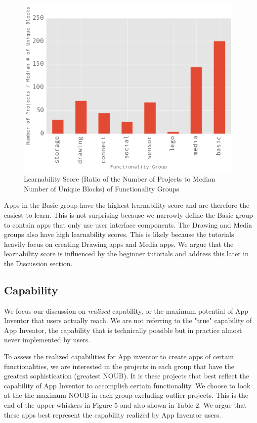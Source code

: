 \documentclass[conference]{IEEEtran}
\begin{document}
\begin{figure}[h!]
	\centering
	\includegraphics[width=1\linewidth]{learnability.png}
	\caption{Learnability Score (Ratio of the Number of Projects to Median Number of Unique Blocks) of Functionality Groups}
	\label{LearnabilityScore}
\end{figure}

Apps in the Basic group have the highest learnability score and are therefore the easiest to learn. This is not surprising because we narrowly define the Basic group to contain apps that only use user interface components. The Drawing and Media groups also have high learnability scores. This is likely because the tutorials heavily focus on creating Drawing apps and Media apps. We argue that the learnability score is influenced by the beginner tutorials and address this later in the Discussion section.

\subsection{Capability}
We focus our discussion on \emph{realized} capability, or the maximum potential of App Inventor that users actually reach. We are not referring to the "true" capability of App Inventor, the capability that is technically possible but in practice almost never implemented by users. 

To assess the realized capabilities for App inventor to create apps of certain functionalities, we are interested in the projects in each group that have the greatest sophistication (greatest NOUB). It is these projects that best reflect the capability of App Inventor to accomplish certain functionality. We choose to look at the the maximum NOUB in each group excluding outlier projects. This is the end of the upper whiskers in Figure 5 and also shown in Table 2. We argue that these apps best represent the capability realized by App Inventor users.
\end{document}
